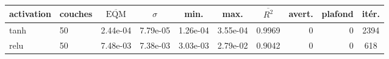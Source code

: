 \begin{tabular}{l l S[table-format=1.2e-2] S[table-format=1.2e-2] S[table-format=1.2e-2] S[table-format=1.2e-2] S[table-format=1.4] r r S[table-format=4]}
\toprule
{activation} & {couches} & {\(\overline{\mathrm{EQM}}\)} & {\(\sigma\)} & {min.} & {max.} & {\(\overline{R^2}\)} & {avert.} & {plafond} & {it\'er.} \\
\midrule
tanh & 50 & 2.44e-04 & 7.79e-05 & 1.26e-04 & 3.55e-04 & 0.9969 & 0 & 0 & 2394 \\
relu & 50 & 7.48e-03 & 7.38e-03 & 3.03e-03 & 2.79e-02 & 0.9042 & 0 & 0 & 618 \\
\bottomrule
\end{tabular}
